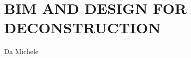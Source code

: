 \section{\uppercase{BIM and Design for Deconstruction}}
\label{sec:introduction}

\noindent Da Michele

\noindent 
\lipsum[2-4]

